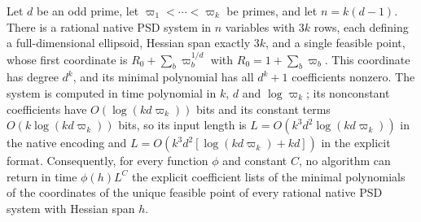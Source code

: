 \begin{corollary}
\label{cor:qc-feasible-output}
Let $d$ be an odd prime, let $\varpi_1<\cdots<\varpi_k$ be primes, and let
$n=k(d-1)$. There is a rational native PSD system in $n$ variables with $3k$
rows, each defining a full-dimensional ellipsoid, Hessian span exactly $3k$,
and a single feasible point, whose first coordinate is
$R_0+\sum_b\varpi_b^{1/d}$ with $R_0=1+\sum_b\varpi_b$. This coordinate has
degree $d^k$, and its minimal polynomial has all $d^k+1$ coefficients nonzero.
The system is computed in time polynomial in $k$, $d$ and $\log\varpi_k$; its
nonconstant coefficients have $O(\log(kd\varpi_k))$ bits and its constant
terms $O(k\log(kd\varpi_k))$ bits, so its input length is
$L=O(k^3d^2\log(kd\varpi_k))$ in the native encoding and
$L=O(k^3d^2[\log(kd\varpi_k)+kd])$ in the explicit format. Consequently, for
every function $\phi$ and constant $C$, no algorithm can return in time
$\phi(h)L^C$ the explicit
coefficient lists of the minimal polynomials of the coordinates of the unique
feasible point of every rational native PSD system with Hessian span $h$.
\end{corollary}

